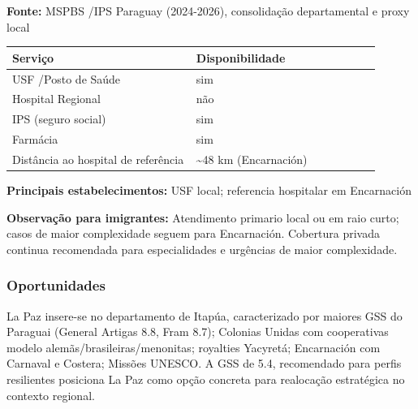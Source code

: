 \textbf{Fonte:} MSPBS /\allowbreak  IPS Paraguay (2024-2026), consolidação
departamental e proxy local

{\def\LTcaptype{none} %
\begin{longtable}{@{}>{\raggedright\arraybackslash}p{0.45\linewidth} >{\raggedright\arraybackslash}p{0.45\linewidth}@{}}
\toprule\noalign{}
Serviço & Disponibilidade \\
\midrule\noalign{}
\endhead
\bottomrule\noalign{}
\endlastfoot
USF /\allowbreak  Posto de Saúde & sim \\
Hospital Regional & não \\
IPS (seguro social) & sim \\
Farmácia & sim \\
Distância ao hospital de referência & \textasciitilde48 km
(Encarnación) \\
\end{longtable}
}

\textbf{Principais estabelecimentos:} USF local; referencia hospitalar
em Encarnación

\textbf{Observação para imigrantes:} Atendimento primario local ou em
raio curto; casos de maior complexidade seguem para Encarnación.
Cobertura privada continua recomendada para especialidades e urgências
de maior complexidade.
\newpage

\subsubsection*{Oportunidades}\label{oport-la-paz-0726}
La Paz insere-se no departamento de Itapúa, caracterizado por maiores GSS do Paraguai (General Artigas 8.8, Fram 8.7); Colonias Unidas com cooperativas modelo alemãs/brasileiras/menonitas; royalties Yacyretá; Encarnación com Carnaval e Costera; Missões UNESCO. A GSS de 5.4, recomendado para perfis resilientes posiciona La Paz como opção concreta para realocação estratégica no contexto regional.

